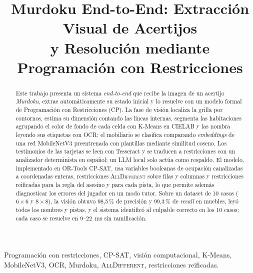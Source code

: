\documentclass[conference,a4paper]{IEEEtran}
\newcommand{\AllDiff}{\textsc{AllDifferent}}
\begin{document}
\title{Murdoku End-to-End: Extracción Visual de Acertijos\\y Resolución mediante Programación con Restricciones}

\author{
\and
{}
\and
{}
}

\maketitle

\begin{abstract}
Este trabajo presenta un sistema \emph{end-to-end} que recibe la imagen de un acertijo
\emph{Murdoku}, extrae automáticamente su estado inicial y lo resuelve con un modelo formal
de Programación con Restricciones (CP). La fase de visión localiza la grilla por contornos,
estima su dimensión contando las líneas internas, segmenta las habitaciones agrupando el
color de fondo de cada celda con K-Means en CIELAB y las nombra leyendo sus etiquetas con
OCR; el mobiliario se clasifica comparando \emph{embeddings} de una red MobileNetV3
preentrenada con plantillas mediante similitud coseno. Los testimonios de las tarjetas se
leen con Tesseract y se traducen a restricciones con un analizador determinista en español;
un LLM local solo actúa como respaldo. El modelo, implementado en OR-Tools CP-SAT, usa
variables booleanas de ocupación canalizadas a coordenadas enteras, restricciones
\AllDiff{} sobre filas y columnas y restricciones reificadas para la regla del asesino y para
cada pista, lo que permite además diagnosticar los errores del jugador en un modo tutor.
Sobre un dataset de 10 casos ($6\times6$ y $8\times8$), la visión obtuvo 98,5\,\% de
precisión y 99,3\,\% de \emph{recall} en muebles, leyó todos los nombres y pistas, y el
sistema identificó al culpable correcto en los 10 casos; cada caso se resuelve en
9--22~ms sin ramificación.
\end{abstract}

\begin{IEEEkeywords}
Programación con restricciones, CP-SAT, visión computacional, K-Means, MobileNetV3,
OCR, Murdoku, \AllDiff{}, restricciones reificadas.
\end{IEEEkeywords}
\end{document}
